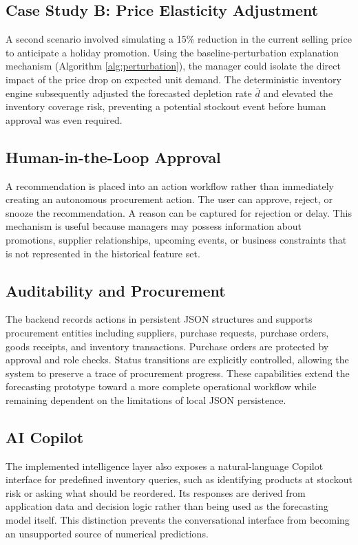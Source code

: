 \documentclass[9pt,conference]{IEEEtran}
\providecommand{\syscite}[1]{}
\begin{document}
\subsection{Case Study B: Price Elasticity Adjustment}
A second scenario involved simulating a 15\% reduction in the current selling price to anticipate a holiday promotion. Using the baseline-perturbation explanation mechanism (Algorithm \ref{alg:perturbation}), the manager could isolate the direct impact of the price drop on expected unit demand. The deterministic inventory engine subsequently adjusted the forecasted depletion rate $\overline{d}$ and elevated the inventory coverage risk, preventing a potential stockout event before human approval was even required.

\subsection{Human-in-the-Loop Approval}
A recommendation is placed into an action workflow rather than immediately creating an autonomous procurement action. \syscite{[cite: 1]} The user can approve, reject, or snooze the recommendation. \syscite{[cite: 1]} A reason can be captured for rejection or delay. \syscite{[cite: 1]} This mechanism is useful because managers may possess information about promotions, supplier relationships, upcoming events, or business constraints that is not represented in the historical feature set. \syscite{[cite: 1]}

\subsection{Auditability and Procurement}
The backend records actions in persistent JSON structures and supports procurement entities including suppliers, purchase requests, purchase orders, goods receipts, and inventory transactions. \syscite{[cite: 1]} Purchase orders are protected by approval and role checks. \syscite{[cite: 1]} Status transitions are explicitly controlled, allowing the system to preserve a trace of procurement progress. \syscite{[cite: 1]} These capabilities extend the forecasting prototype toward a more complete operational workflow while remaining dependent on the limitations of local JSON persistence. \syscite{[cite: 1]}

\subsection{AI Copilot}
The implemented intelligence layer also exposes a natural-language Copilot interface for predefined inventory queries, such as identifying products at stockout risk or asking what should be reordered. \syscite{[cite: 1]} Its responses are derived from application data and decision logic rather than being used as the forecasting model itself. \syscite{[cite: 1]} This distinction prevents the conversational interface from becoming an unsupported source of numerical predictions. \syscite{[cite: 1]}
\end{document}
